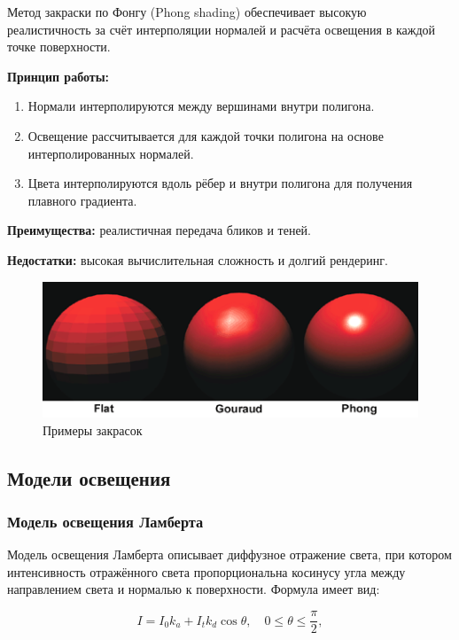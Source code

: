 Метод закраски по Фонгу (Phong shading) обеспечивает высокую реалистичность за счёт интерполяции нормалей и расчёта освещения в каждой точке поверхности.

\textbf{Принцип работы:}
\begin{enumerate}
    \item Нормали интерполируются между вершинами внутри полигона.
    \item Освещение рассчитывается для каждой точки полигона на основе интерполированных нормалей.
    \item Цвета интерполируются вдоль рёбер и внутри полигона для получения плавного градиента.
\end{enumerate}

\textbf{Преимущества:} реалистичная передача бликов и теней.

\textbf{Недостатки:} высокая вычислительная сложность и долгий рендеринг.

\begin{figure}[H]
    \centering
    \includegraphics[width=1\linewidth]{images/shading.png}
    \caption{Примеры закрасок}
    \label{shading}
\end{figure}

\subsection{Модели освещения}

\subsubsection{Модель освещения Ламберта}

Модель освещения Ламберта описывает диффузное отражение света, при котором интенсивность отражённого света пропорциональна косинусу угла между направлением света и нормалью к поверхности. Формула имеет вид:

$$
I = I_0 k_a + I_t k_d \cos \theta, \quad 0 \leq \theta \leq \frac{\pi}{2},
$$

